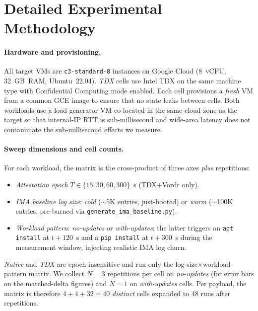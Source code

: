 \appendix

\section{Detailed Experimental Methodology}
\label{app:methodology}

\paragraph{Hardware and provisioning.}
All target VMs are \texttt{c3-standard-8} instances on Google Cloud
(8~vCPU, 32~GB~RAM, Ubuntu~22.04). \emph{TDX} cells use Intel TDX on
the same machine type with Confidential Computing mode enabled. Each
cell provisions a \emph{fresh} VM from a common GCE image to ensure
that no state leaks between cells. Both workloads use a load-generator
VM co-located in the same cloud zone as the target so that internal-IP
RTT is sub-millisecond and wide-area latency does not contaminate the
sub-millisecond effects we measure.

\paragraph{Sweep dimensions and cell counts.}
For each workload, the matrix is the cross-product of three axes
\emph{plus} repetitions:
\begin{itemize}
\item \emph{Attestation epoch} $T \in \{15, 30, 60, 300\}$~s
  (TDX+Vordr only).
\item \emph{IMA baseline log size}: \emph{cold} ($\sim$5K entries,
  just-booted) or \emph{warm} ($\sim$100K entries, pre-burned via
  \texttt{generate\_ima\_baseline.py}).
\item \emph{Workload pattern}: \emph{no-updates} or
  \emph{with-updates}; the latter triggers an \texttt{apt install} at
  $t{+}120$~s and a \texttt{pip install} at $t{+}300$~s during the
  measurement window, injecting realistic IMA log churn.
\end{itemize}
\emph{Native} and \emph{TDX} are epoch-insensitive and run only the
log-size$\times$workload-pattern matrix. We collect $N{=}3$
repetitions per cell on \emph{no-updates} (for error bars on the
matched-delta figures) and $N{=}1$ on \emph{with-updates} cells. Per
payload, the matrix is therefore $4{+}4{+}32 = 40$ \emph{distinct} cells
expanded to $48$ runs after repetitions.

